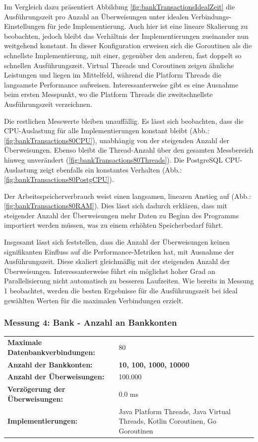 \documentclass[fontsize=12pt,paper=a4,twoside=semi,parskip=half-,headsepline,headinclude]{scrreprt}
\begin{document}
Im Vergleich dazu präsentiert Abbildung \ref{fig:bankTransactionsIdealZeit} die Ausführungszeit pro Anzahl an Überweisungen unter idealen Verbindungs-Einstellungen für jede Implementierung. Auch hier ist eine lineare Skalierung zu beobachten, jedoch bleibt das Verhältnis der Implementierungen zueinander nun weitgehend konstant. In dieser Konfiguration erweisen sich die Goroutinen als die schnellste Implementierung, mit einer, gegenüber den anderen, fast doppelt so schnellen Ausführungszeit. Virtual Threads und Coroutinen zeigen ähnliche Leistungen und liegen im Mittelfeld, während die Platform Threads die langsamste Performance aufweisen. Interessanterweise gibt es eine Ausnahme beim ersten Messpunkt, wo die Platform Threads die zweitschnellste Ausführungszeit verzeichnen.

Die restlichen Messwerte bleiben unauffällig. Es lässt sich beobachten, dass die CPU-Auslastung für alle Implementierungen konstant bleibt (Abb.: \ref{fig:bankTransactions80CPU}), unabhängig von der steigenden Anzahl der Überweisungen. Ebenso bleibt die Thread-Anzahl über den gesamten Messbereich hinweg unverändert (\ref{fig:bankTransactions80Threads}). Die PostgreSQL CPU-Auslastung zeigt ebenfalls ein konstantes Verhalten (Abb.: \ref{fig:bankTransactions80PostgCPU}).

Der Arbeitsspeicherverbrauch weist einen langsamen, linearen Anstieg auf (Abb.: \ref{fig:bankTransactions80RAM}). Dies lässt sich dadurch erklären, dass mit steigender Anzahl der Überweisungen mehr Daten zu Beginn des Programms importiert werden müssen, was zu einem erhöhten Speicherbedarf führt.

Insgesamt lässt sich feststellen, dass die Anzahl der Überweisungen keinen signifikanten Einfluss auf die Performance-Metriken hat, mit Ausnahme der Ausführungszeit. Diese skaliert gleichmäßig mit der steigenden Anzahl der Überweisungen. Interessanterweise führt ein möglichst hoher Grad an Parallelisierung nicht automatisch zu besseren Laufzeiten. Wie bereits in Messung 1 beobachtet, werden die besten Ergebnisse für die Ausführungszeit bei ideal gewählten Werten für die maximalen Verbindungen erzielt.

\subsubsection{Messung 4: Bank - Anzahl an Bankkonten}

\begin{tabularx}{\textwidth}{@{}lX@{}}
	\textbf{Maximale Datenbankverbindungen:} & 80 \\
	\textbf{Anzahl der Bankkonten:} & \textbf{10, 100, 1000, 10000} \\
	\textbf{Anzahl der Überweisungen:} & 100.000 \\
	\textbf{Verzögerung der Überweisungen:} & 0.0 ms \\
	\textbf{Implementierungen:} & Java Platform Threads, Java Virtual Threads, Kotlin Coroutinen, Go Goroutinen
\end{tabularx}
\end{document}
